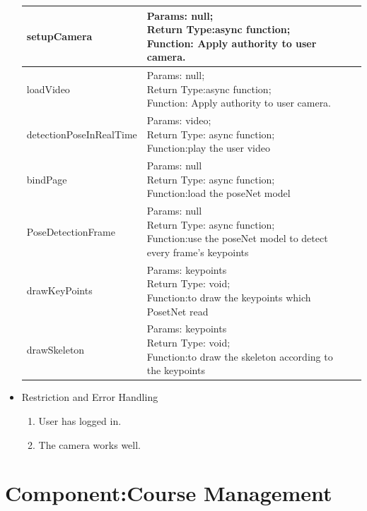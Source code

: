 \documentclass[16pt]{scrreprt}
\begin{document}
\begin{itemize}
\begin{center}
\begin{tabular}{p{6cm}p{10cm}}
        \hline
	    setupCamera & \makecell[l]{Params: null;\\Return Type:async function;\\Function: Apply authority to user camera.}\\ 
        \hline
        loadVideo & \makecell[l]{Params: null;\\Return Type:async function;\\Function: Apply authority to user camera.}\\ 
        \hline
        detectionPoseInRealTime & \makecell[l]{Params: video;\\Return Type: async function;\\Function:play the user video}\\
        \hline
        bindPage &  \makecell[l]{Params: null\\Return Type: async function;\\Function:load the poseNet model}\\
        \hline
        PoseDetectionFrame & \makecell[l]{Params: null\\Return Type: async function;\\Function:use the poseNet model to detect \\every frame's keypoints}\\
        \hline
        drawKeyPoints & \makecell[l]{Params: keypoints\\Return Type: void;\\Function:to draw the keypoints which \\PosetNet read}\\
        \hline
        drawSkeleton & \makecell[l]{Params: keypoints\\Return Type: void;\\Function:to draw the skeleton according to \\the keypoints}\\
        \hline
    \end{tabular}
\end{center}
\item Restriction and Error Handling\\
\begin{enumerate}
	\item User has logged in.
	\item The camera works well.
\end{enumerate} 
\end{itemize}


\section{Component:Course Management}
\end{document}
